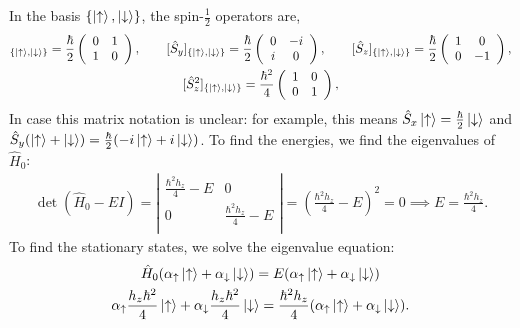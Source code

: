 \documentclass[10pt]{article}
\newcommand{\1}{\mathbf 1}
\begin{document}
In the basis $\{\ket{\uparrow},\ket{\downarrow}\}$, the spin-$\frac{1}{2}$ operators are,
\begin{gather}
	[\hat S_x]_{\{\ket{\uparrow},\ket{\downarrow}\}}
	=
	\frac{\hbar}{2} \left(
		\begin{array}{cc}
			0 & 1\\
			1 & 0
		\end{array}
	\right),
	\qquad
	[\hat S_y]_{\{\ket{\uparrow},\ket{\downarrow}\}}
	=
	\frac{\hbar}{2} \left(
		\begin{array}{cc}
			0 & -i\\
			i & 0
		\end{array}
	\right),
	\qquad
	[\hat S_z]_{\{\ket{\uparrow},\ket{\downarrow}\}}
	=
	\frac{\hbar}{2} \left(
		\begin{array}{cc}
			1 & 0\\
			0 & -1
		\end{array}
	\right),
	\\
	[\hat S_z^2]_{\{\ket{\uparrow},\ket{\downarrow}\}}
	=
	\frac{\hbar^2}{4} \left(
		\begin{array}{cc}
			1 & 0\\
			0 & 1
		\end{array}
	\right),
\end{gather}
In case this matrix notation is unclear: for example, this means $\hat S_x \ket{\uparrow} = \frac{\hbar}{2} \ket{\downarrow}$ and $\hat S_y (\ket{\uparrow} + \ket{\downarrow}) = \frac{\hbar}{2} (-i \ket{\uparrow} + i \ket{\downarrow})$.
To find the energies, we find the eigenvalues of $\hat H_0$:
\begin{align}
	\det(\hat H_0 - E I)
	=
	\left|
\begin{array}{cc}
 \frac{\hbar ^2 h_z}{4}-E & 0 \\
 0 & \frac{\hbar ^2 h_z}{4}-E \\
\end{array}
\right|
=
\left(
	\frac{\hbar ^2 h_z}{4}-E
\right)^2
=
0
\implies
E = \frac{\hbar ^2 h_z}{4}.
\end{align}
To find the stationary states, we solve the eigenvalue equation:
\begin{gather}
	\hat H_0 (\alpha_\uparrow \ket{\uparrow} + \alpha_\downarrow \ket{\downarrow})
	=
	E(\alpha_\uparrow \ket{\uparrow} + \alpha_\downarrow \ket{\downarrow})
\\
	\alpha_\uparrow \frac{h_z \hbar^2}{4} \ket{\uparrow} + \alpha_\downarrow \frac{h_z \hbar^2}{4}\ket{\downarrow}
	=
	\frac{\hbar ^2 h_z}{4}(\alpha_\uparrow \ket{\uparrow} + \alpha_\downarrow \ket{\downarrow}).
\end{gather}
\end{document}
